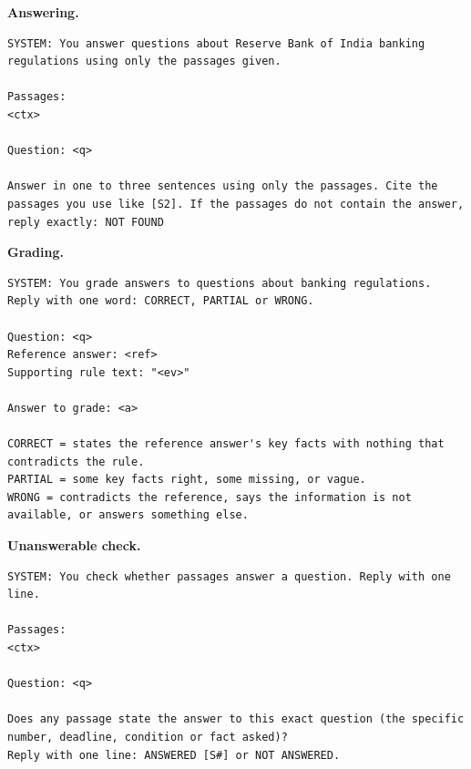 \noindent\textbf{Answering.}
\begin{lstlisting}
SYSTEM: You answer questions about Reserve Bank of India banking regulations using only the passages given.

Passages:
<ctx>

Question: <q>

Answer in one to three sentences using only the passages. Cite the passages you use like [S2]. If the passages do not contain the answer, reply exactly: NOT FOUND
\end{lstlisting}

\noindent\textbf{Grading.}
\begin{lstlisting}
SYSTEM: You grade answers to questions about banking regulations. Reply with one word: CORRECT, PARTIAL or WRONG.

Question: <q>
Reference answer: <ref>
Supporting rule text: "<ev>"

Answer to grade: <a>

CORRECT = states the reference answer's key facts with nothing that contradicts the rule.
PARTIAL = some key facts right, some missing, or vague.
WRONG = contradicts the reference, says the information is not available, or answers something else.
\end{lstlisting}

\noindent\textbf{Unanswerable check.}
\begin{lstlisting}
SYSTEM: You check whether passages answer a question. Reply with one line.

Passages:
<ctx>

Question: <q>

Does any passage state the answer to this exact question (the specific number, deadline, condition or fact asked)?
Reply with one line: ANSWERED [S#] or NOT ANSWERED.
\end{lstlisting}
